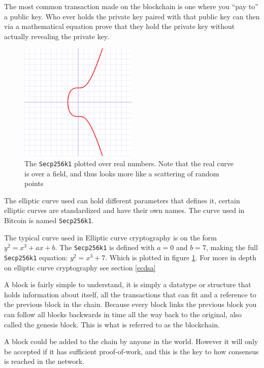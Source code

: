 The most common transaction made on the blockchain is one where you \enquote{pay to}
a public key. Who ever holds the private key paired with that public key can
then via a mathematical equation prove that they hold the private key without
actually revealing the private key.\cite{quantabytes}

\begin{figure}[H]
	\centering
	\includegraphics[width=0.5\textwidth]{introduction/images/Secp256k1.png}
	\caption{The \texttt{Secp256k1} plotted over real numbers. Note that the real
	curve is over a field, and thus looks more like a scattering of random points}
	\label{fig:eccbasic}
\end{figure}

The elliptic curve used can hold different parameters that defines it, certain
elliptic curves are standardized and have their own names. The curve used in
Bitcoin is named \texttt{Secp256k1}.\cite{Secp256k1_def}\cite{antonopoulos_2017}

The typical curve used in Elliptic curve cryptography is on the form
$y^2=x^3+ax+b$. The \texttt{Secp256k1} is defined with $a=0$ and $b=7$, making
the full \texttt{Secp256k1} equation: $y^2=x^3+7$. Which is plotted in figure
\ref*{fig:eccbasic}. For more in depth on elliptic curve cryptography see
section \ref{ecdsa}

A block is fairly simple to understand, it is simply a datatype or structure
that holds information about itself, all the transactions that can fit and a
reference to the previous block in the chain. Because every block links the previous
block you can follow all blocks backwards in time
all the way back to the original, also called the genesis block.\cite{genesis}
This is what is referred to as the blockchain.

A block could be added to the chain by anyone in the world. However it will only
be accepted if it has sufficient proof-of-work, and this is the key to how
consensus is reached in the network.\cite{antonopoulos_2017}

